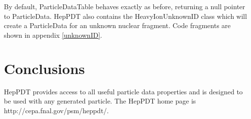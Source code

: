 By default, ParticleDataTable behaves exactly as before, 
returning a null pointer to ParticleData.  HepPDT also contains the
HeavyIonUnknownID class which will create a ParticleData for an unknown
nuclear fragment.  Code fragments are shown in appendix \ref{unknownID}.

\section{Conclusions}

HepPDT provides access to all useful particle data properties
and is designed to be used with any generated particle.    
The HepPDT home page is http://cepa.fnal.gov/psm/heppdt/.
